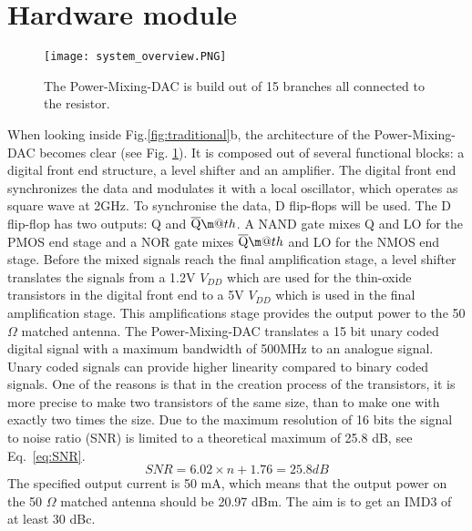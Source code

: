 \makeatletter
\newcommand*{\textoverline}[1]{$\overline{\hbox{#1}}\m@th$}
\makeatother

\section{Hardware module}\label{sec:overview}
\begin{figure}[h]
\texttt{[image: system\_overview.PNG]}
\caption{The Power-Mixing-DAC is build out of 15 branches all connected to the resistor.}
\label{fig:system_overview}
\end{figure}
When looking inside Fig.\ref{fig:traditional}b, the architecture of the Power-Mixing-DAC becomes clear (see Fig. \ref{fig:system_overview}). It is composed out of several functional blocks: a digital front end structure, a level shifter and an amplifier. 
The digital front end synchronizes the data and modulates it with a local oscillator, which operates as square wave at 2GHz. To synchronise the data, D flip-flops will be used. The D flip-flop has two outputs: Q and \textoverline{Q}. A NAND gate mixes Q and LO for the PMOS end stage and a NOR gate mixes \textoverline{Q} and LO for the NMOS end stage. Before the mixed signals reach the final amplification stage, a level shifter translates the signals from a 1.2V $V_{DD}$ which are used for the thin-oxide transistors in the digital front end to a 5V $V_{DD}$ which is used in the final amplification stage. This amplifications stage provides the output power to the 50 $\Omega$ matched antenna.
The Power-Mixing-DAC translates a 15 bit unary coded digital signal with a maximum bandwidth of 500MHz to an analogue signal. Unary coded  signals can provide higher linearity compared to binary coded signals. One of the reasons is that in the creation process of the transistors, it is more precise to make two transistors of the same size, than to make one with exactly two times the size. Due to the maximum resolution of 16 bits the signal to noise ratio (SNR) is limited to a theoretical maximum of 25.8 dB, see Eq.~\ref{eq:SNR}.
\begin{equation}\label{eq:SNR}{SNR = 6.02 \times n + 1.76 = 25.8 dB}\end{equation}
The specified output current is 50 mA, which means that the output power on the 50 $\Omega$ matched antenna should be 20.97 dBm. The aim is to get an IMD3 of at least 30 dBc.

